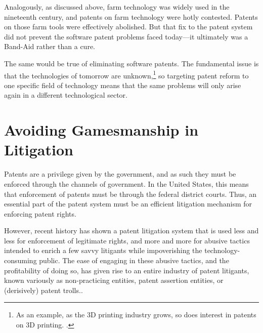 \documentclass[11pt,twocolumn,titlepage]{article}
\begin{document}
Analogously, as discussed above, farm technology was
widely used in the nineteenth century,
and patents on farm technology were hotly contested.
Patents on those farm tools were effectively abolished.
But that fix to the patent system did not prevent the software patent
problems faced today---it ultimately was a Band-Aid rather than a cure.

The same would be true of eliminating software patents.
The fundamental issue is that the technologies of
tomorrow are unknown,\footnote{As an example, as the 3D printing industry grows,
so does interest in patents on 3D printing. .}
so targeting patent reform to one specific field of
technology means that the same problems will only arise again in a different
technological sector.


\section{Avoiding Gamesmanship in Litigation}
\SectionNote
{}

Patents are a privilege given by the government, and as such they must be
enforced
through the channels of government. In the United States, this means that
enforcement of patents must be through the federal district courts. Thus, an
essential part of the patent system must be an efficient litigation mechanism
for enforcing patent rights.

However, recent history has shown a patent litigation system that is used less
and less for enforcement of legitimate rights, and more and more for abusive
tactics intended to enrich a few savvy litigants while impoverishing the
technology-consuming public.
The ease of engaging in these abusive tactics, and
the profitability of doing so, has given rise to an entire industry of patent
litigants, known variously as non-practicing entities, patent assertion
entities, or (derisively) patent trolls..
\end{document}
